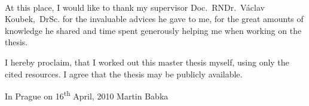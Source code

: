 \normalsize
\setcounter{page}{2}
\ \vspace{10mm} 

\noindent At this place, I would like to thank my supervisor Doc.~RNDr.~Václav Koubek,~DrSc. for the invaluable advices he gave to me, for the great amounts of knowledge he shared and time spent generously helping me when working on the thesis.

\vspace{\fill}
\noindent I hereby proclaim, that I worked out this master thesis myself, using only the cited resources. I agree that the thesis may be publicly available.

\bigskip
\noindent In Prague on 16\textsuperscript{th} April, 2010 \hspace{\fill}Martin Babka

\tableofcontents 

\newpage 

